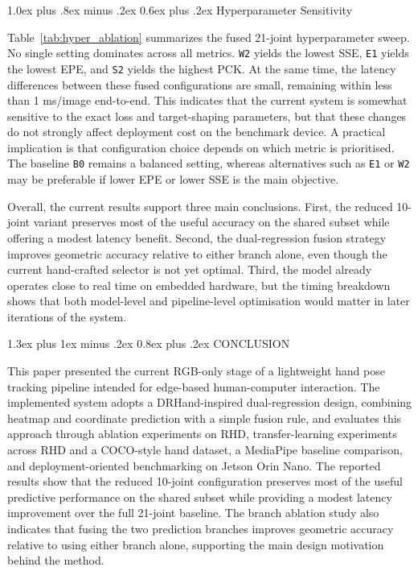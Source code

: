 \documentclass[10pt,letterpaper,twocolumn]{article}
\makeatletter
\renewcommand\section{\@startsection{section}{1}{\z@}%
  {1.3ex plus 1ex minus .2ex}%
  {0.8ex plus .2ex}%
  {\centering\normalfont\small\scshape}}
\renewcommand\subsection{\@startsection{subsection}{2}{\z@}%
  {1.0ex plus .8ex minus .2ex}%
  {0.6ex plus .2ex}%
  {\normalfont\itshape}}
\makeatother
\begin{document}
\subsection{Hyperparameter Sensitivity}

Table~\ref{tab:hyper_ablation} summarizes the fused 21-joint hyperparameter sweep. No single setting dominates across all metrics. \texttt{W2} yields the lowest SSE, \texttt{E1} yields the lowest EPE, and \texttt{S2} yields the highest PCK. At the same time, the latency differences between these fused configurations are small, remaining within less than 1 ms/image end-to-end. This indicates that the current system is somewhat sensitive to the exact loss and target-shaping parameters, but that these changes do not strongly affect deployment cost on the benchmark device. A practical implication is that configuration choice depends on which metric is prioritised. The baseline \texttt{B0} remains a balanced setting, whereas alternatives such as \texttt{E1} or \texttt{W2} may be preferable if lower EPE or lower SSE is the main objective.

Overall, the current results support three main conclusions. First, the reduced 10-joint variant preserves most of the useful accuracy on the shared subset while offering a modest latency benefit. Second, the dual-regression fusion strategy improves geometric accuracy relative to either branch alone, even though the current hand-crafted selector is not yet optimal. Third, the model already operates close to real time on embedded hardware, but the timing breakdown shows that both model-level and pipeline-level optimisation would matter in later iterations of the system.

\section{CONCLUSION}

This paper presented the current RGB-only stage of a lightweight hand pose tracking pipeline intended for edge-based human-computer interaction. The implemented system adopts a DRHand-inspired dual-regression design, combining heatmap and coordinate prediction with a simple fusion rule, and evaluates this approach through ablation experiments on RHD, transfer-learning experiments across RHD and a COCO-style hand dataset, a MediaPipe baseline comparison, and deployment-oriented benchmarking on Jetson Orin Nano. The reported results show that the reduced 10-joint configuration preserves most of the useful predictive performance on the shared subset while providing a modest latency improvement over the full 21-joint baseline. The branch ablation study also indicates that fusing the two prediction branches improves geometric accuracy relative to using either branch alone, supporting the main design motivation behind the method.
\end{document}
